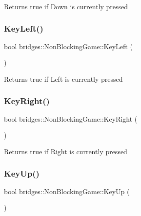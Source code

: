 \begin{DoxyReturn}{Returns}
true if Down is currently pressed 
\end{DoxyReturn}
\mbox{\label{classbridges_1_1_non_blocking_game_a03afd28f5d06713b1566a02755f4830f}} 
\subsubsection{\texorpdfstring{KeyLeft()}{KeyLeft()}}
{\footnotesize\ttfamily bool bridges\+::\+Non\+Blocking\+Game\+::\+Key\+Left (\begin{DoxyParamCaption}{ }\end{DoxyParamCaption})\hspace{0.3cm}{\ttfamily [inline]}}

\begin{DoxyReturn}{Returns}
true if Left is currently pressed 
\end{DoxyReturn}
\mbox{\label{classbridges_1_1_non_blocking_game_a025324211229593cf024863c59c28475}} 
\subsubsection{\texorpdfstring{KeyRight()}{KeyRight()}}
{\footnotesize\ttfamily bool bridges\+::\+Non\+Blocking\+Game\+::\+Key\+Right (\begin{DoxyParamCaption}{ }\end{DoxyParamCaption})\hspace{0.3cm}{\ttfamily [inline]}}

\begin{DoxyReturn}{Returns}
true if Right is currently pressed 
\end{DoxyReturn}
\mbox{\label{classbridges_1_1_non_blocking_game_a0afb4ce2d9ef5452e13ecb5ff1c49056}} 
\subsubsection{\texorpdfstring{KeyUp()}{KeyUp()}}
{\footnotesize\ttfamily bool bridges\+::\+Non\+Blocking\+Game\+::\+Key\+Up (\begin{DoxyParamCaption}{ }\end{DoxyParamCaption})\hspace{0.3cm}{\ttfamily [inline]}}

